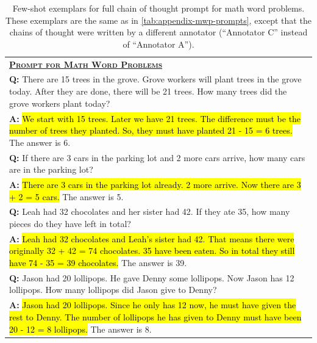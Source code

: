 \begingroup
\begin{table}[H]
    \centering
    \small
    \caption{
    Few-shot exemplars for full chain of thought prompt for math word problems. These exemplars are the same as in \cref{tab:appendix-mwp-prompts}, except that the chains of thought were written by a different annotator (``Annotator C'' instead of ``Annotator A'').
    }
    \begin{tabular}{p{\linewidth}}
        \toprule
        \underline{\textbf{\textsc{Prompt for Math Word Problems}}} \\
        \vspace{-2mm}
        \textbf{Q:} There are 15 trees in the grove. Grove workers will plant trees in the grove today. After they are done, there will be 21 trees. How many trees did the grove workers plant today? \\
        \vspace{-1mm}
        \textbf{A:} \hl{We start with 15 trees. Later we have 21 trees. The difference must be the number of trees they planted. So, they must have planted 21 - 15 = 6 trees.} The answer is 6. \\
        \vspace{0mm}
        \textbf{Q:} If there are 3 cars in the parking lot and 2 more cars arrive, how many cars are in the parking lot? \\
        \vspace{-1mm}
        \textbf{A:} \hl{There are 3 cars in the parking lot already. 2 more arrive. Now there are 3 + 2 = 5 cars.}  The answer is 5. \\
        \vspace{0mm}
        \textbf{Q:} Leah had 32 chocolates and her sister had 42. If they ate 35, how many pieces do they have left in total? \\
        \vspace{-1mm}
        \textbf{A:} \hl{Leah had 32 chocolates and Leah's sister had 42. That means there were originally 32 + 42 = 74 chocolates. 35 have been eaten. So in total they still have 74 - 35 = 39 chocolates.} The answer is 39. \\
        \vspace{0mm}
        \textbf{Q:} Jason had 20 lollipops. He gave Denny some lollipops. Now Jason has 12 lollipops. How many lollipops did Jason give to Denny? \\
        \vspace{-1mm}
        \textbf{A:} \hl{Jason had 20 lollipops. Since he only has 12 now, he must have given the rest to Denny. The number of lollipops he has given to Denny must have been 20 - 12 = 8 lollipops.} The answer is 8. \\

\end{tabular}
\end{table}
